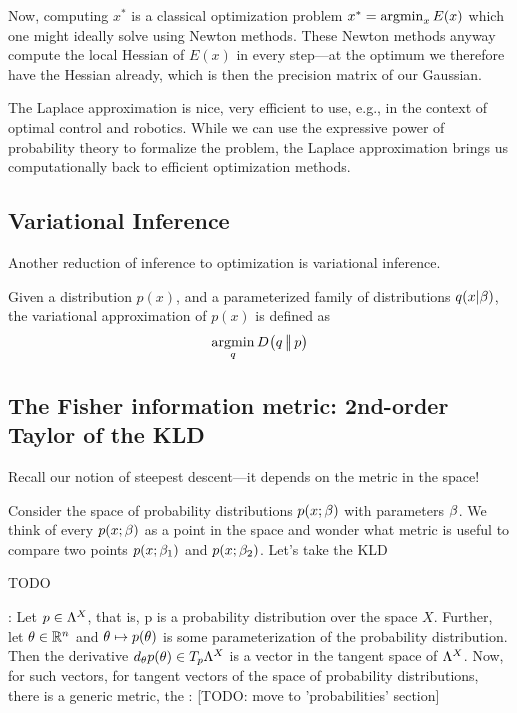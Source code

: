 Now, computing $x^*$ is a classical optimization problem $x^*
= \operatorname*{argmin}_x E(x)$ which one might ideally solve using Newton
methods. These Newton methods anyway compute the local Hessian of
$E(x)$ in every step---at the optimum we therefore have the Hessian
already, which is then the precision matrix of our Gaussian.

The Laplace approximation is nice, very efficient to use, e.g., in the
context of optimal control and robotics. While we can use the
expressive power of probability theory to formalize the problem, the
Laplace approximation brings us computationally back to efficient
optimization methods.

\subsection{Variational Inference}

Another reduction of inference to optimization is variational
inference.
\begin{myDefinition}
Given a distribution $p(x)$, and a parameterized family of
distributions $q(x|\beta)$, the variational approximation of $p(x)$ is
defined as
\begin{equation}
\operatorname*{argmin}_q D_{{}}\big(q\,\big|\!\big|\,p\big)
\end{equation}
\end{myDefinition}


\subsection{The Fisher information metric: 2nd-order Taylor of the KLD}

Recall our notion of steepest descent---it depends on the metric in
the space!

Consider the space of probability distributions $p(x;\beta)$
with parameters $\beta$. We think of every  $p(x;\beta)$ as a point in the
space and wonder what metric is useful to compare two points  $p(x;\beta_1)$
and $p(x;\beta_2)$. Let's take the KLD

TODO

: Let $p\in\Lambda^X$, that is, p
is a probability distribution over the space $X$. Further, let
$\theta\in{\mathbb{R}}^n$ and $\theta \mapsto p(\theta)$ is some parameterization of the
probability distribution. Then the derivative $d_\theta p(\theta) \in
T_p \Lambda^X$ is a vector in the tangent space of $\Lambda^X$. Now, for such
vectors, for tangent vectors of the space of probability
distributions, there is a generic metric, the :
[TODO: move to 'probabilities' section]

